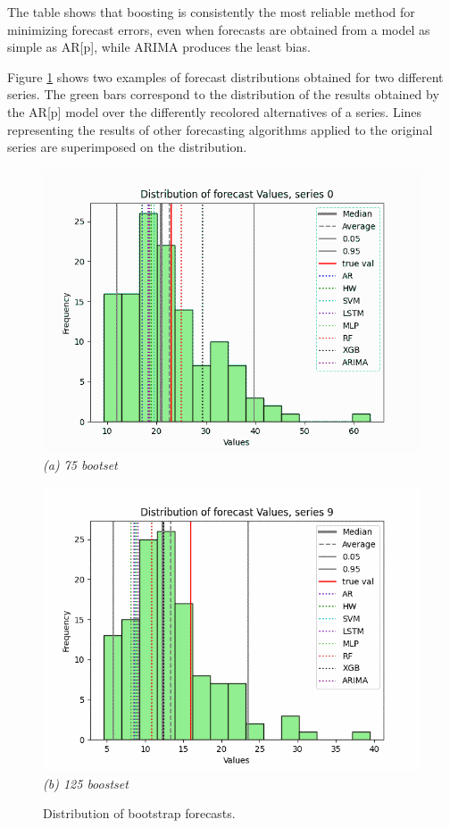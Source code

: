 \documentclass[preprint,11pt,authoryear]{elsarticle}
\begin{document}
The table shows that boosting is consistently the most reliable method for minimizing forecast errors, even when forecasts are obtained from a model as simple as AR[p], while ARIMA produces the least bias.

Figure \ref{fig:distr} shows two examples of forecast distributions obtained for two different series. The green bars correspond to the distribution of the results obtained by the AR[p] model over the differently recolored alternatives of a series. Lines representing the results of other forecasting algorithms applied to the original series are superimposed on the distribution.


\begin{figure}[ht]
	\centering
	\begin{minipage}{0.48\textwidth}
		\centering
		\includegraphics[width=\linewidth]{distr_75_0.png}
		\label{fig:dista}%
		\vspace{0.5em}
		\textit{(a) 75 bootset}
	\end{minipage}
	\hfill
	\begin{minipage}{0.48\textwidth}
		\centering
		\includegraphics[width=\linewidth]{distr_75_9.png}
		\label{fig:distb}%
		\vspace{0.5em}
		\textit{(b) 125 boostset}
	\end{minipage}
	\caption{Distribution of bootstrap forecasts.}
	\label{fig:distr}
\end{figure}
\end{document}
